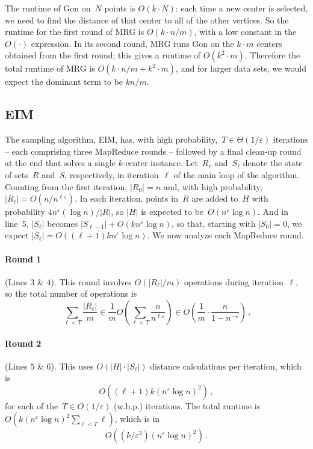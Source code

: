 \documentclass[11pt]{article}
\newcommand{\eps}{\ensuremath{\varepsilon}}
\newcommand{\ours}{{\sc MRG}\xspace}
\newcommand{\ene}{{\sc EIM}\xspace}
\newcommand{\gon}{{\sc Gon}\xspace}
\begin{document}
The runtime of \gon on~$N$ points is $O(k\cdot N)$: each time a new center is selected, we need to find the distance of that center to all of the other vertices.
So the runtime for the first round of \ours is $O(k\cdot n/m)$, with a low
constant in the~$O(\cdot)$ expression.
In its second round, \ours runs \gon on the $k\cdot m$
centers obtained from the first round; this gives a runtime of $O(k^2\cdot m)$. 
Therefore the total runtime of \ours is $O(k\cdot n/m + k^2\cdot m)$, and 
for larger data sets, we would expect the dominant term to be $kn/m$. 


\subsection{\ene}
The sampling algorithm, \ene, has, with high probability,~$T\in \Theta(1/\eps)$
iterations -- each comprising
three MapReduce rounds --
followed by a final clean-up round at the end that solves a single $k$-center
instance. 
Let~$R_{\ell}$  and~$S_{\ell}$ denote the state of sets~$R$ and~$S$,
respectively, in iteration~$\ell$ of the main loop of the algorithm.
Counting from the first iteration, $|R_0|=n$ and, with high probability, $|R_\ell| = O(n/n^{\ell\eps})$.
In each iteration, points in~$R$ are added to~$H$ with probability
$4n^{\eps}(\log n)/|R|$, so $|H|$ is expected to be~$O(n^\eps \log n)$.
And in line~5, $|S_\ell|$ becomes $|S_{\ell-1}| + O(kn^\eps\log n)$, so that,
starting with $|S_0|=0$, we expect 
$|S_\ell| = O((\ell+1) kn^\eps\log n)$.
We now analyze each MapReduce round.

\vspace{2mm}
\paragraph*{Round 1}
(Lines $3$ \& $4$). 
This round involves $O(|R_{\ell}|/m)$ operations during iteration~$\ell$,
so the total number of operations is
\vspace{-2mm}
$$
\sum_{\ell< T} \frac{|R_\ell|}{m} \in \frac 1 m O\left(\sum_{\ell< T} \frac n {n^{\ell\eps}}\right)
\in O\left(\frac 1 m \cdot \frac n {1-n^{-\eps}}\right)\,.
$$
\vspace{-6mm}

\paragraph*{Round 2}
(Lines $5$ \& $6$). 
This uses $O(|H|\cdot|S_\ell|)$ distance calculations per iteration,
which is $$O((\ell+1) k(n^{\eps}\log n )^2)\,,$$
for each of
the~$T \in O(1/\eps)$ (w.h.p.) iterations.
The total runtime is $O(k(n^{\eps}\log n)^2\sum_{\ell < T}\ell)$, which is in
$$O((k/\eps^2)(n^{\eps}\log n)^2)\,.$$
\vspace{-10mm}
\end{document}
